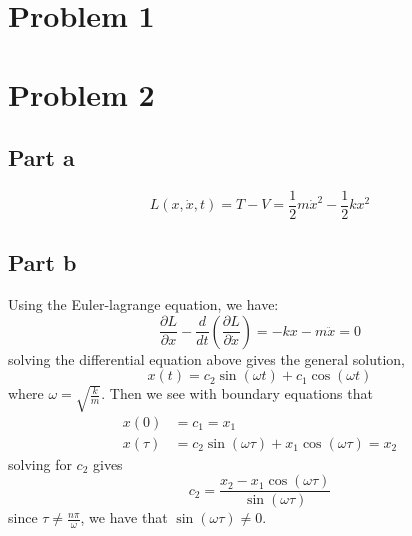 \documentclass[12pt]{report}
\begin{document}
\maketitle

\section*{Problem 1}
\section*{Problem 2}
\subsection*{Part a}
\begin{equation*}
  L(x, \dot{x}, t) = T - V = \frac{1}{2}m\dot{x}^2 - \frac{1}{2}kx^2
\end{equation*}
\subsection*{Part b}
Using the Euler-lagrange equation, we have:
\begin{equation*}
  \frac{\partial L}{\partial x} - \frac{d}{dt}\left(\frac{\partial L}{\partial \dot{x}}\right) = -kx - m \ddot{x} = 0
\end{equation*}
solving the differential equation above gives the general solution,
\begin{equation*}
  x(t) = c_2 \sin\left(\omega t\right) + c_1 \cos\left(\omega t\right)
\end{equation*}
where $\omega = \sqrt{\frac{k}{m}}$. Then we see with boundary equations that
\begin{align*}
  x(0) &= c_1 = x_1 \\
  x(\tau) &= c_2 \sin\left(\omega \tau\right) + x_1 \cos\left(\omega \tau\right) = x_2
\end{align*}
solving for $c_2$ gives
\begin{equation*}
  c_2 = \frac{x_2 - x_1 \cos\left(\omega \tau\right)}{\sin\left(\omega \tau\right)}
\end{equation*}
since $\tau \neq \frac{n\pi}{\omega}$, we have that $\sin(\omega \tau) \neq 0$. 
\end{document}
